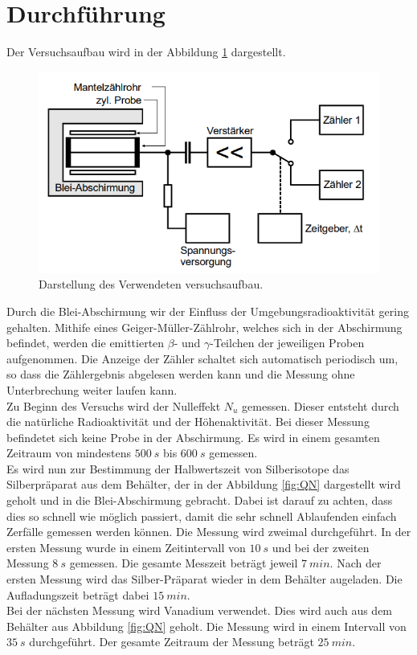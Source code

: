\section{Durchführung}
\label{sec:Durchführung}
Der Versuchsaufbau wird in der Abbildung \ref{fig:Aufbau} dargestellt.
\begin{figure}[H]
    \centering
    \includegraphics[scale=0.5]{content/Aufbau.png}
    \caption{Darstellung des Verwendeten versuchsaufbau.}
    \label{fig:Aufbau}
\end{figure}
Durch die Blei-Abschirmung wir der Einfluss der Umgebungsradioaktivität gering gehalten.
Mithife eines Geiger-Müller-Zählrohr, welches sich in der Abschirmung befindet, werden die emittierten $\beta$- und $\gamma$-Teilchen der jeweiligen Proben aufgenommen.
Die Anzeige der Zähler schaltet sich automatisch periodisch um, so dass die Zählergebnis abgelesen werden kann und die Messung ohne Unterbrechung
weiter laufen kann.\\

Zu Beginn des Versuchs wird der Nulleffekt $N_u$ gemessen.
Dieser entsteht durch die natürliche Radioaktivität und der Höhenaktivität.
Bei dieser Messung befindetet sich keine Probe in der Abschirmung.
Es wird in einem gesamten Zeitraum von mindestens $\qty{500}{s}$ bis $\qty{600}{s}$ gemessen.\\

Es wird nun zur Bestimmung der Halbwertszeit von Silberisotope das Silberpräparat aus dem Behälter, der in der Abbildung \ref{fig:QN} dargestellt wird geholt
und in die Blei-Abschirmung gebracht.
Dabei ist darauf zu achten, dass dies so schnell wie möglich passiert, damit die sehr schnell Ablaufenden einfach Zerfälle gemessen werden können.
Die Messung wird zweimal durchgeführt.
In der ersten Messung wurde in einem Zeitintervall von $\qty{10}{s}$ und bei der zweiten Messung $\qty{8}{s}$ gemessen.
Die gesamte Messzeit beträgt jeweil $\qty{7}{min}$.
Nach der ersten Messung wird das Silber-Präparat wieder in dem Behälter augeladen.
Die Aufladungszeit beträgt dabei $\qty{15}{min}$.\\

Bei der nächsten Messung wird Vanadium verwendet.
Dies wird auch aus dem Behälter aus Abbildung \ref{fig:QN} geholt.
Die Messung wird in einem Intervall von $\qty{35}{s}$ durchgeführt.
Der gesamte Zeitraum der Messung beträgt $\qty{25}{min}$. 

